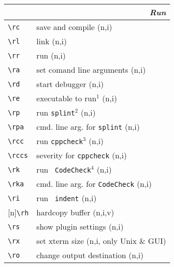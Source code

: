 \documentclass[oneside,11pt,landscape,DIV16]{scrartcl}
\newcommand{\Rep}{{\tiny{[n]}}}
\begin{document}
\begin{multicols}{3}
\begin{center}
\vspace{100mm}
\begin{tabular}[]{|p{12mm}|p{58mm}|}
\hline
\multicolumn{2}{|r|}{\textsl{\textbf{R}un}} \\
\hline \verb'\rc'  & save and compile                        \hfill (n,i)\\
\hline \verb'\rl'  & link                                    \hfill (n,i)\\
\hline \verb'\rr'  & run                                     \hfill (n,i)\\
\hline \verb'\ra'  & set comand line arguments               \hfill (n,i)\\
\hline \verb'\rd'  & start debugger                          \hfill (n,i)\\
\hline \verb'\re'  & executable to run$^1$                   \hfill (n,i)\\
%
\hline \verb'\rp'  & run \texttt{splint}$^2$                 \hfill (n,i)\\
\hline \verb'\rpa' & cmd. line arg. for \texttt{splint}      \hfill (n,i)\\
%
\hline \verb'\rcc' & run \texttt{cppcheck}$^3$               \hfill (n,i)\\
\hline \verb'\rccs'& severity for \texttt{cppcheck}          \hfill (n,i)\\
%
\hline \verb'\rk'  & run \texttt{ CodeCheck}$^4$             \hfill (n,i)\\
\hline \verb'\rka' & cmd. line arg. for \texttt{CodeCheck}   \hfill (n,i)\\
%
\hline \verb'\ri'  & run \texttt{ indent}        \hfill (n,i)\\
\hline \Rep\verb'\rh'  & hardcopy buffer         \hfill (n,i,v)\\
\hline \verb'\rs'  & show plugin settings        \hfill (n,i)\\
\hline \verb'\rx'  & set xterm size              \hfill (n,i, only Unix \& GUI)\\
\hline \verb'\ro'  & change output destination   \hfill (n,i)\\
\hline 
\end{tabular}
%

\end{center}
\end{multicols}
\end{document}
